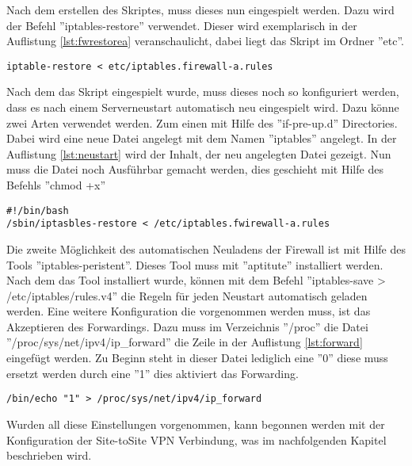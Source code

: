 \vspace{\baselineskip}
Nach dem erstellen des Skriptes, muss dieses nun eingespielt werden. Dazu wird der Befehl ''iptables-restore'' verwendet. Dieser wird exemplarisch in der Auflistung \ref{lst:fwrestorea} veranschaulicht, dabei liegt das Skript im Ordner ''etc''.
\newline
\lstset{
	basicstyle=\footnotesize, frame=tb,
	xleftmargin=.2\textwidth, xrightmargin=.2\textwidth
}
\begin{lstlisting}[caption={Einspielen des Firewallskriptes der Firma a},label=lst:fwrestorea]
iptable-restore < etc/iptables.firewall-a.rules
\end{lstlisting}
\vspace{\baselineskip}
Nach dem das Skript eingespielt wurde, muss dieses noch so konfiguriert werden, dass es nach einem Serverneustart automatisch neu eingespielt wird. Dazu könne zwei Arten verwendet werden. Zum einen mit Hilfe des ''if-pre-up.d'' Directories. Dabei wird eine neue Datei angelegt mit dem Namen ''iptables'' angelegt. In der Auflistung \ref{lst:neustart} wird der Inhalt, der neu angelegten Datei gezeigt. Nun muss die Datei noch Ausführbar gemacht werden, dies geschieht mit Hilfe des Befehls ''chmod +x''
\newline
\lstset{
	basicstyle=\footnotesize, frame=tb,
	xleftmargin=.2\textwidth, xrightmargin=.2\textwidth
}
\begin{lstlisting}[caption={Automatisches Laden des Iptablesskriptes bei Serverneustart},label=lst:neustart]
#!/bin/bash
/sbin/iptasbles-restore < /etc/iptables.fwirewall-a.rules
\end{lstlisting}
\vspace{\baselineskip}
Die zweite Möglichkeit des automatischen Neuladens der Firewall ist mit Hilfe des Tools ''iptables-peristent''. Dieses Tool muss mit ''aptitute'' installiert werden. Nach dem das Tool installiert wurde, können mit dem Befehl ''iptables-save > /etc/iptables/rules.v4'' die Regeln für jeden Neustart automatisch geladen werden. 
\newline 
Eine weitere Konfiguration die vorgenommen werden muss, ist das Akzeptieren des Forwardings. Dazu muss im Verzeichnis ''/proc'' die Datei ''/proc/sys/net/ipv4/ip\_forward'' die Zeile in der Auflistung \ref{lst:forward} eingefügt werden. Zu Beginn steht in dieser Datei lediglich eine ''0'' diese muss ersetzt werden durch eine ''1'' dies aktiviert das Forwarding.\newline
\lstset{
	basicstyle=\footnotesize, frame=tb,
	xleftmargin=.2\textwidth, xrightmargin=.2\textwidth
}
\begin{lstlisting}[caption={Forwarding aktivieren},label=lst:forward]
/bin/echo "1" > /proc/sys/net/ipv4/ip_forward
\end{lstlisting}
\vspace{\baselineskip}
Wurden all diese Einstellungen vorgenommen, kann begonnen werden mit der Konfiguration der Site-toSite VPN Verbindung, was im nachfolgenden Kapitel beschrieben wird.



